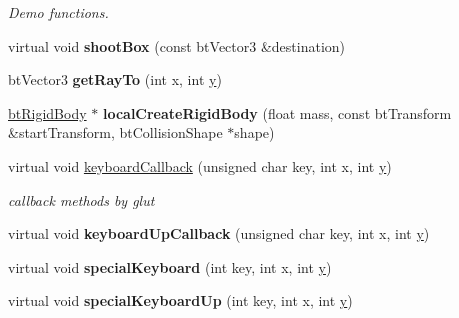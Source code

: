 \begin{DoxyCompactItemize}
\begin{DoxyCompactList}\small\item\em Demo functions. \end{DoxyCompactList}\item 
\hypertarget{class_demo_application_a3196ef59200adf29174688ac6e2c01ac}{virtual void {\bfseries shoot\+Box} (const bt\+Vector3 \&destination)}\label{class_demo_application_a3196ef59200adf29174688ac6e2c01ac}

\item 
\hypertarget{class_demo_application_a31bfbdc5d9fa2db72705a7294a0598e0}{bt\+Vector3 {\bfseries get\+Ray\+To} (int x, int \hyperlink{_ice_utils_8h_aa7ffaed69623192258fb8679569ff9ba}{y})}\label{class_demo_application_a31bfbdc5d9fa2db72705a7294a0598e0}

\item 
\hypertarget{class_demo_application_a9affefbe21c1ff706a81a24337c836ac}{\hyperlink{classbt_rigid_body}{bt\+Rigid\+Body} $\ast$ {\bfseries local\+Create\+Rigid\+Body} (float mass, const bt\+Transform \&start\+Transform, bt\+Collision\+Shape $\ast$shape)}\label{class_demo_application_a9affefbe21c1ff706a81a24337c836ac}

\item 
\hypertarget{class_demo_application_a3e5668f691ca2ea307b953d97ed340d5}{virtual void \hyperlink{class_demo_application_a3e5668f691ca2ea307b953d97ed340d5}{keyboard\+Callback} (unsigned char key, int x, int \hyperlink{_ice_utils_8h_aa7ffaed69623192258fb8679569ff9ba}{y})}\label{class_demo_application_a3e5668f691ca2ea307b953d97ed340d5}

\begin{DoxyCompactList}\small\item\em callback methods by glut \end{DoxyCompactList}\item 
\hypertarget{class_demo_application_ae6abc8471ae8074ab7cf47c8ab2c3f07}{virtual void {\bfseries keyboard\+Up\+Callback} (unsigned char key, int x, int \hyperlink{_ice_utils_8h_aa7ffaed69623192258fb8679569ff9ba}{y})}\label{class_demo_application_ae6abc8471ae8074ab7cf47c8ab2c3f07}

\item 
\hypertarget{class_demo_application_a589c1843fbf2f8ecf7ea08dfbbc3e6c3}{virtual void {\bfseries special\+Keyboard} (int key, int x, int \hyperlink{_ice_utils_8h_aa7ffaed69623192258fb8679569ff9ba}{y})}\label{class_demo_application_a589c1843fbf2f8ecf7ea08dfbbc3e6c3}

\item 
\hypertarget{class_demo_application_aec8da43197c436aec9f474b03774b2a2}{virtual void {\bfseries special\+Keyboard\+Up} (int key, int x, int \hyperlink{_ice_utils_8h_aa7ffaed69623192258fb8679569ff9ba}{y})}\label{class_demo_application_aec8da43197c436aec9f474b03774b2a2}


\end{DoxyCompactItemize}
